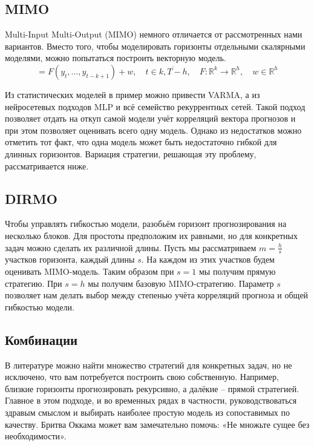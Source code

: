 \documentclass[12pt,fleqn]{article}
\begin{document}
\subsection{MIMO}
Multi-Input Multi-Output (MIMO) немного отличается от рассмотренных нами вариантов.
Вместо того, чтобы моделировать горизонты отдельными скалярными моделями, можно попытаться построить векторную модель.
\begin{equation}
  [y_{t+h}, \ldots, y_{t+1}] = F(y_t, \ldots, y_{t-k+1}) + w, \quad t \in \overline{k, T-h}, \quad F:\mathbb{R}^k \rightarrow \mathbb{R}^h, \quad w \in \mathbb{R}^h
\end{equation}

Из статистических моделей в пример можно привести VARMA, а из нейросетевых подходов MLP и всё семейство рекуррентных сетей.
Такой подход позволяет отдать на откуп самой модели учёт корреляций вектора прогнозов и при этом позволяет оценивать всего одну модель.
Однако из недостатков можно отметить тот факт, что одна модель может быть недостаточно гибкой для длинных горизонтов.
Вариация стратегии, решающая эту проблему, рассматривается ниже.

\subsection{DIRMO}
Чтобы управлять гибкостью модели, разобьём горизонт прогнозирования на несколько блоков.
Для простоты предположим их равными, но для конкретных задач можно сделать их различной длины.
Пусть мы рассматриваем $m=\frac{h}{s}$ участков горизонта, каждый длины $s$.
На каждом из этих участков будем оценивать MIMO-модель.
Таким образом при $s=1$ мы получим прямую стратегию.
При $s=h$ мы получим базовую MIMO-стратегию.
Параметр $s$ позволяет нам делать выбор между степенью учёта корреляций прогноза и общей гибкостью модели.

\subsection{Комбинации}
В литературе можно найти множество стратегий для конкретных задач, но не исключено, что вам потребуется построить свою собственную.
Например, близкие горизонты прогнозировать рекурсивно, а далёкие -- прямой стратегией.
Главное в этом подходе, и во временных рядах в частности, руководствоваться здравым смыслом и выбирать наиболее простую модель из сопоставимых по качеству.
Бритва Оккама может вам замечательно помочь: «Не множьте сущее без необходимости».

\newpage
\end{document}
